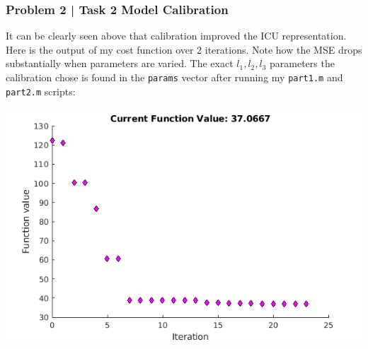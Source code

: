 \documentclass[aspectratio=1610]{beamer}
\begin{document}
\begin{frame}[fragile]
\frametitle{Problem 2 | Task 2 Model Calibration}

\footnotesize{It can be clearly seen above that calibration improved the 
ICU representation. Here is the output of my cost function over 2 iterations. Note how the MSE drops substantially when parameters are varied. The exact $l_1, l_2, l_3$ parameters the calibration chose is found in the \verb|params| vector after running my \verb|part1.m| and \verb|part2.m| scripts:}


\vspace{1em}

\centering
\includegraphics[width = .65\textwidth]{cost}\\

\end{frame}
\end{document}
